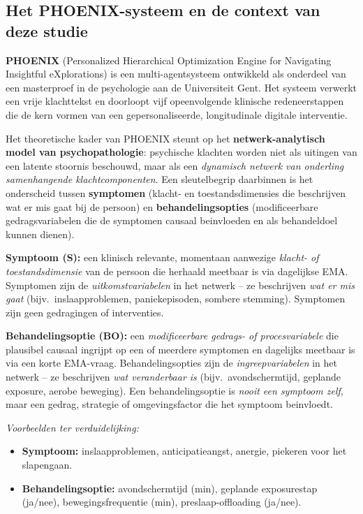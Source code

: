 \documentclass[11pt,a4paper]{article}
\begin{document}
\subsection*{Het PHOENIX-systeem en de context van deze studie}

\textbf{PHOENIX} (Personalized Hierarchical Optimization Engine for Navigating
Insightful eXplorations) is een multi-agentsysteem ontwikkeld als onderdeel van
een masterproef in de psychologie aan de Universiteit Gent. Het systeem verwerkt
een vrije klachttekst en doorloopt vijf opeenvolgende klinische redeneerstappen
die de kern vormen van een gepersonaliseerde, longitudinale digitale interventie.

Het theoretische kader van PHOENIX steunt op het \textbf{netwerk-analytisch model
van psychopathologie}: psychische klachten worden niet
als uitingen van een latente stoornis beschouwd, maar als een \emph{dynamisch
netwerk van onderling samenhangende klachtcomponenten}. Een sleutelbegrip daarbinnen
is het onderscheid tussen \textbf{symptomen} (klacht- en toestandsdimensies die
beschrijven wat er mis gaat bij de persoon) en \textbf{behandelingsopties}
(modificeerbare gedragsvariabelen die de symptomen causaal beinvloeden en als
behandeldoel kunnen dienen).

\vspace{0.4em}
\begin{instrbox}[title={Kerndefinities: symptoom versus behandelingsoptie}]
\small
\textbf{Symptoom (S):} een klinisch relevante, momentaan aanwezige
\emph{klacht- of toestandsdimensie} van de persoon die herhaald meetbaar is via
dagelijkse EMA. Symptomen zijn de \emph{uitkomstvariabelen} in het netwerk -- ze
beschrijven \emph{wat er mis gaat} (bijv.\ inslaapproblemen, paniekepisoden,
sombere stemming). Symptomen zijn geen gedragingen of interventies.

\medskip
\textbf{Behandelingsoptie (BO):} een \emph{modificeerbare gedrags- of procesvariabele}
die plausibel causaal ingrijpt op een of meerdere symptomen en dagelijks meetbaar
is via een korte EMA-vraag. Behandelingsopties zijn de \emph{ingreepvariabelen} in het
netwerk -- ze beschrijven \emph{wat veranderbaar is} (bijv.\ avondschermtijd,
geplande exposure, aerobe beweging). Een behandelingsoptie is \emph{nooit een symptoom zelf},
maar een gedrag, strategie of omgevingsfactor die het symptoom beinvloedt.

\medskip\small
\textit{Voorbeelden ter verduidelijking:}
\begin{itemize}[topsep=1pt,itemsep=0pt]
\item \textbf{Symptoom:} inslaapproblemen, anticipatieangst, anergie, piekeren voor het slapengaan.
\item \textbf{Behandelingsoptie:} avondschermtijd (min), geplande exposurestap (ja/nee),
bewegingsfrequentie (min), preslaap-offloading (ja/nee).
\end{itemize}
\end{instrbox}
\end{document}
